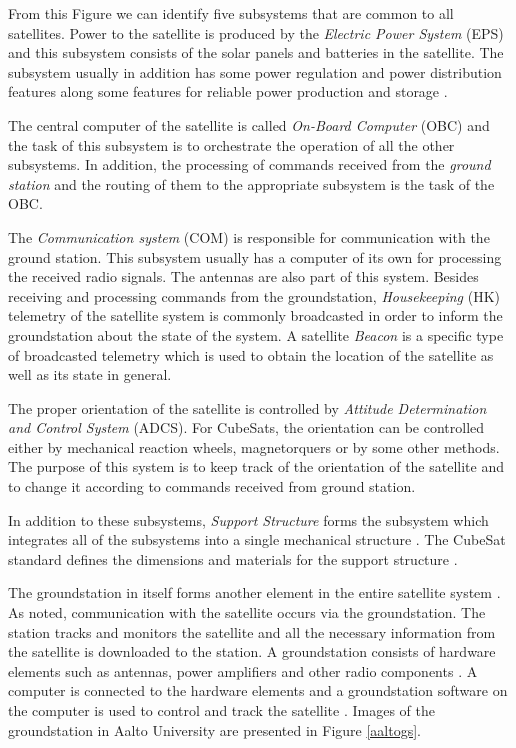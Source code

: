 \documentclass[english,12pt,a4paper,pdftex,elec,utf8]{aaltothesis}
\begin{document}
From this Figure we can identify five subsystems that are common to all satellites. Power to the satellite is produced by the \textit{Electric Power System} (EPS) and this subsystem consists of the solar panels and batteries in the satellite. The subsystem usually in addition has some power regulation and power distribution features along some features for reliable power production and storage \cite{spacesystemsengineering}.\par 
The central computer of the satellite is called \textit{On-Board Computer} (OBC) and the task of this subsystem is to orchestrate the operation of all the other subsystems. In addition, the processing of commands received from the \textit{ground station} and the routing of them to the appropriate subsystem is the task of the OBC. \cite{spacesystemsengineering} \par 
The \textit{Communication system} (COM) is responsible for communication with the ground station. This subsystem usually has a computer of its own for processing the received radio signals. The antennas are also part of this system. Besides receiving and processing commands from the groundstation, \textit{Housekeeping} (HK) telemetry of the satellite system is commonly broadcasted in order to inform the groundstation about the state of the system. A satellite \textit{Beacon} is a specific type of broadcasted telemetry which is used to obtain the location of the satellite as well as its state in general.   \cite{spacesystemsengineering} \par
The proper orientation of the satellite is controlled by \textit{Attitude Determination and Control System} (ADCS). For CubeSats, the orientation can be controlled either by mechanical reaction wheels, magnetorquers or by some other methods. The purpose of this system is to keep track of the orientation of the satellite and to change it according to commands received from ground station. \cite{spacesystemsengineering}\par 
In addition to these subsystems, \textit{Support Structure} forms the subsystem which integrates all of the subsystems into a single mechanical structure \cite{spacesystemsengineering}. The CubeSat standard defines the dimensions and materials for the support structure \cite{cds}. \par 
The groundstation in itself forms another element in the entire satellite system \cite{spacesystemsengineering}. As noted, communication with the satellite occurs via the groundstation. The station tracks and monitors the satellite and all the necessary information from the satellite is downloaded to the station. A groundstation consists of hardware elements such as antennas, power amplifiers and other radio components \cite{radiohandbook}. A computer is connected to the hardware elements and a groundstation software on the computer is used to control and track the satellite \cite{spacesystemsengineering, radiohandbook}. Images of the groundstation in Aalto University are presented in Figure \ref{aaltogs}.
\end{document}
